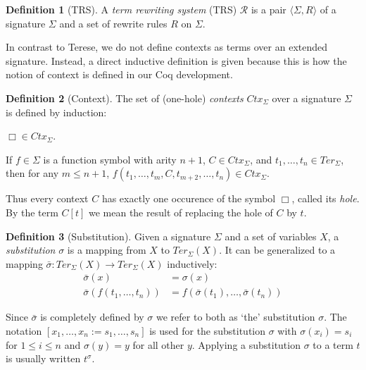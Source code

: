 \documentclass[11pt,oneside,a4paper,final]{report}
\theoremstyle{definition}
\newtheorem{definition}{Definition}
\begin{document}
\begin{definition}[TRS]
A \emph{term rewriting system} (TRS) $\mathcal{R}$ is a pair $\langle \Sigma,
R \rangle$ of a signature $\Sigma$ and a set of rewrite rules $R$ on
$\Sigma$.
\end{definition}

In contrast to Terese, we do not define contexts as terms over an extended
signature. Instead, a direct inductive definition is given because this is how
the notion of context is defined in our Coq development.

\begin{definition}[Context]
The set of (one-hole) \emph{contexts} $Ctx_\Sigma$ over a signature $\Sigma$
is defined by induction:
\begin{compactenum}
  \item
    $\Box \in Ctx_\Sigma$.
  \item
    If $f \in \Sigma$ is a function symbol with arity $n + 1$, $C \in
    Ctx_\Sigma$, and $t_1, \ldots, t_n \in Ter_\Sigma$, then for any $m
    \leq n + 1$, $f(t_1, \ldots, t_m, C, t_{m+2}, \ldots, t_{n}) \in
    Ctx_\Sigma$.
\end{compactenum}
\end{definition}

Thus every context $C$ has exactly one occurence of the symbol $\Box$, called
its \emph{hole}. By the term $C[t]$ we mean the result of replacing the hole
of $C$ by $t$.

\begin{definition}[Substitution]
Given a signature $\Sigma$ and a set of variables $X$, a \emph{substitution}
$\sigma$ is a mapping from $X$ to $Ter_\Sigma(X)$. It can be generalized to
a mapping $\bar{\sigma} : Ter_\Sigma(X) \rightarrow Ter_\Sigma(X)$
inductively:
\begin{align*}
  \bar{\sigma}(x) &= \sigma(x)\\
  \bar{\sigma}(f(t_1, \ldots, t_n)) &= f(\bar{\sigma}(t_1), \ldots, \bar{\sigma}(t_n))
\end{align*}
\end{definition}

Since $\bar{\sigma}$ is completely defined by $\sigma$ we refer to both as
`the' substitution $\sigma$. The notation $[x_1, \ldots, x_n := s_1, \ldots,
  s_n]$ is used for the substitution $\sigma$ with $\sigma(x_i) = s_i$ for $1
\leq i \leq n$ and $\sigma(y) = y$ for all other $y$. Applying a substitution %
$\sigma$ to a term $t$ is usually written $t^\sigma$.
\end{document}

